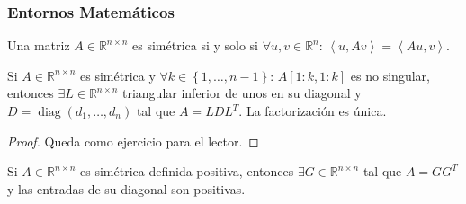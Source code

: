 \documentclass[8pt,aspectratio=1610,c,spanish]{beamer}
\begin{document}
\begin{frame}
\frametitle{Entornos Matemáticos}

\begin{definition}
Una matriz $A\in\mathbb{R}^{n\times n}$ es \alert{simétrica} si y solo si $\forall u,v\in\mathbb{R}^{n}$:
$\left\langle u,Av\right\rangle=\left\langle Au,v\right\rangle$.
\end{definition}

\begin{theorem}
Si $A\in\mathbb{R}^{n\times n}$ es simétrica y $\forall k\in\left\{1,\dotsc,n-1\right\}$: $A\left[1:k, 1:k\right]$
es no singular, entonces $\exists L\in\mathbb{R}^{n\times n}$ triangular inferior de unos en su diagonal y
$D=\operatorname{diag}\left(d_{1},\dotsc,d_{n}\right)$ tal que $A=LDL^{T}$. La factorización es única.
\end{theorem}

\begin{proof}Queda como ejercicio para el lector.\end{proof}

\begin{corollary}
Si $A\in\mathbb{R}^{n\times n}$ es simétrica definida positiva, entonces $\exists G\in\mathbb{R}^{n\times n}$ tal que
$A=GG^{T}$ y las entradas de su diagonal son positivas.
\end{corollary}

\begin{lemma}\end{lemma}

\begin{columns}
\begin{column}{.48\paperwidth}
	\begin{example}\end{example}
\end{column}
\begin{column}{.48\paperwidth}
	\begin{examples}\end{examples}
\end{column}
\end{columns}
\end{frame}
\end{document}
